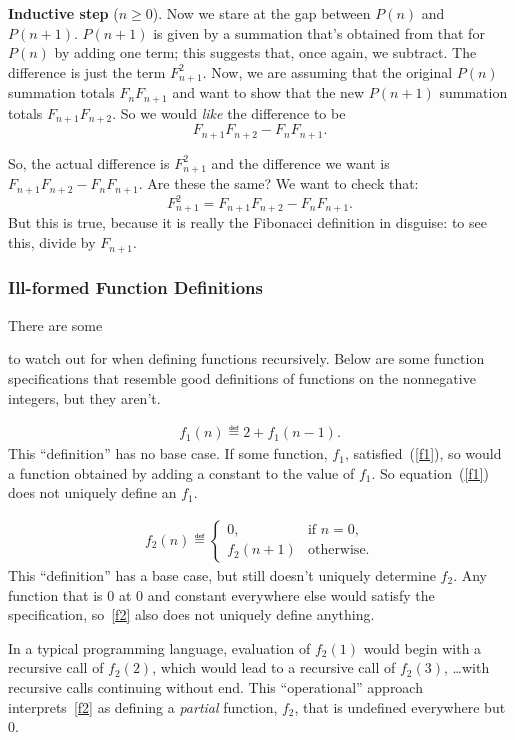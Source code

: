\begin{definition}
\begin{optional}
\textbf{Inductive step} ($n\geq 0$).  Now we stare at the gap between
$P(n)$ and $P(n+1)$.  $P(n+1)$ is given by a summation that's obtained
from that for $P(n)$ by adding one term; this suggests that, once again,
we subtract.  The difference is just the term $F_{n+1}^2$.  Now, we are
assuming that the original $P(n)$ summation totals $F_n F_{n+1}$ and want
to show that the new $P(n+1)$ summation totals $F_{n+1} F_{n+2}$.  So we
would {\em like\/} the difference to be
\[
F_{n+1} F_{n+2} - F_n F_{n+1}.
\]

So, the actual difference is $F_{n+1}^2$ and the difference we want is
$F_{n+1} F_{n+2} - F_n F_{n+1}$.  Are these the same?  We want to check
that:
\[
F_{n+1}^2 = F_{n+1} F_{n+2} - F_n F_{n+1}.
\]
But this is true, because it is really the Fibonacci definition in
disguise: to see this, divide by $F_{n+1}$.

\end{optional}
\fi

\subsubsection{Ill-formed Function Definitions}

There are some  to watch out for when
defining functions recursively.  Below are some function specifications
that resemble good definitions of functions on the nonnegative integers,
but they aren't.

\begin{eqnarray}\label{f1}
f_1(n)\eqdef 2+f_1(n-1).
\end{eqnarray}
This ``definition'' has no base case.  If some function, $f_1$,
satisfied~(\ref{f1}), so would a function obtained by adding a constant to
the value of $f_1$.  So equation~(\ref{f1}) does not uniquely define
an $f_1$.

\begin{eqnarray}\label{f2}
f_2(n) \eqdef
\begin{cases}
 0, & \text{if $n=0$},\\
 f_2(n+1) &  \text{otherwise}.
\end{cases}
\end{eqnarray}
This ``definition'' has a base case, but still doesn't uniquely determine
$f_2$.  Any function that is 0 at 0 and constant everywhere else would
satisfy the specification, so~\eqref{f2} also does not uniquely define
anything.

In a typical programming language, evaluation of $f_2(1)$ would begin with
a recursive call of $f_2(2)$, which would lead to a recursive call of
$f_2(3)$, \dots with recursive calls continuing without end.  This
``operational'' approach interprets~\eqref{f2} as defining a
\emph{partial} function, $f_2$, that is undefined everywhere but 0.


\end{definition}
